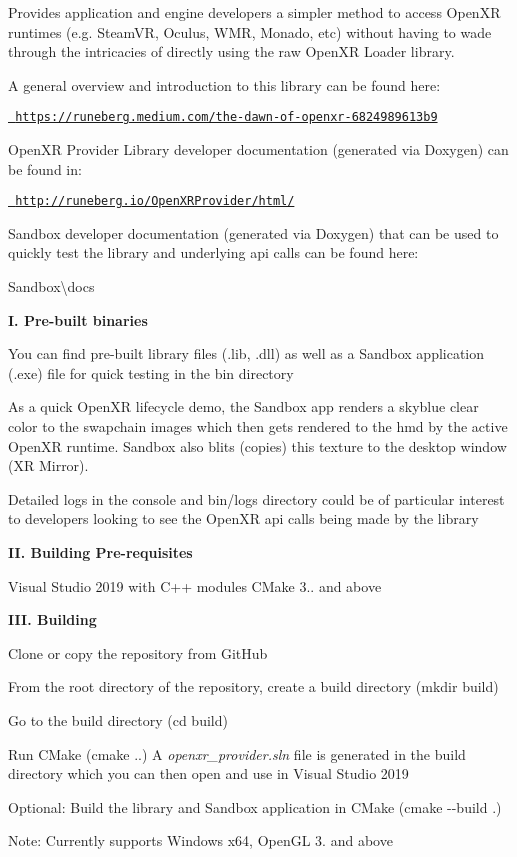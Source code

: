 Provides application and engine developers a simpler method to access Open\+XR runtimes (e.\+g. Steam\+VR, Oculus, W\+MR, Monado, etc) without having to wade through the intricacies of directly using the raw Open\+XR Loader library.

A general overview and introduction to this library can be found here\+:

\href{https://runeberg.medium.com/the-dawn-of-openxr-6824989613b9}{\texttt{ https\+://runeberg.\+medium.\+com/the-\/dawn-\/of-\/openxr-\/6824989613b9}}

Open\+XR Provider Library developer documentation (generated via Doxygen) can be found in\+:

\href{http://runeberg.io/OpenXRProvider/html/}{\texttt{ http\+://runeberg.\+io/\+Open\+X\+R\+Provider/html/}}

Sandbox developer documentation (generated via Doxygen) that can be used to quickly test the library and underlying api calls can be found here\+:

{\ttfamily Sandbox\textbackslash{}docs}

{\bfseries{I. Pre-\/built binaries}}

You can find pre-\/built library files (.lib, .dll) as well as a Sandbox application (.exe) file for quick testing in the {\ttfamily bin} directory

As a quick Open\+XR lifecycle demo, the Sandbox app renders a skyblue clear color to the swapchain images which then gets rendered to the hmd by the active Open\+XR runtime. Sandbox also blits (copies) this texture to the desktop window (XR Mirror).

Detailed logs in the console and {\ttfamily bin/logs} directory could be of particular interest to developers looking to see the Open\+XR api calls being made by the library

{\bfseries{II. Building Pre-\/requisites}}

Visual Studio 2019 with C++ modules C\+Make 3.. and above

{\bfseries{I\+II. Building}}


\begin{DoxyEnumerate}
\item Clone or copy the repository from Git\+Hub
\item From the root directory of the repository, create a build directory ({\ttfamily mkdir build})
\item Go to the build directory ({\ttfamily cd build})
\item Run C\+Make ({\ttfamily cmake ..}) A {\itshape openxr\+\_\+provider.\+sln} file is generated in the build directory which you can then open and use in Visual Studio 2019
\item Optional\+: Build the library and Sandbox application in C\+Make ({\ttfamily cmake -\/-\/build .})
\end{DoxyEnumerate}

Note\+: Currently supports Windows x64, Open\+GL 3. and above 